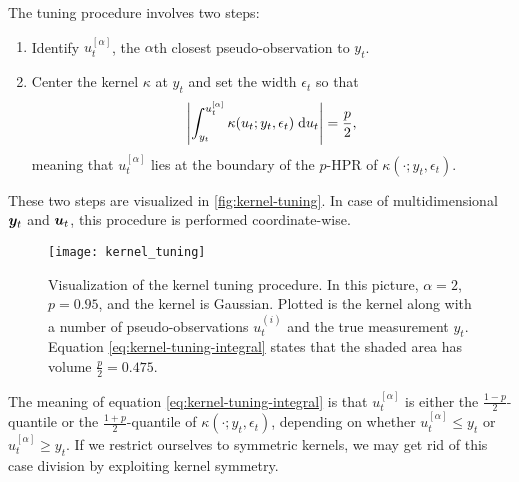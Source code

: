 The tuning procedure involves two steps:
\begin{enumerate}
    \item Identify $u_t^{[\alpha]}$, the $\alpha$th closest pseudo-observation to $y_t$.
    \item Center the kernel $\kappa$ at $y_t$ and set the width $\epsilon_t$ so that
    \begin{equation} \label{eq:kernel-tuning-integral}
    \left| \int_{y_t}^{u_t^{[\alpha]}} \kappa(u_t; y_t, \epsilon_t) \; \mathrm{d}{u_t} \right| = \frac{p}{2},
    \end{equation}
    meaning that $u_t^{[\alpha]}$ lies at the boundary of the $p$-HPR of $\kappa(\cdot; y_t, \epsilon_t)$.
\end{enumerate}
These two steps are visualized in \autoref{fig:kernel-tuning}. In case of multidimensional $\bm{y}_t$ and $\bm{u}_t$, this procedure is performed coordinate-wise. 

\begin{figure}[ht]
    \centering
    \texttt{[image: kernel\_tuning]}
    \caption{Visualization of the kernel tuning procedure. In this picture, ${\alpha = 2}$, ${p = 0.95}$, and the kernel is Gaussian. Plotted is the kernel along with a number of pseudo-observations $u_t^{(i)}$ and the true measurement $y_t$. Equation \eqref{eq:kernel-tuning-integral} states that the shaded area has volume $\frac{p}{2} = 0.475$.}
    \label{fig:kernel-tuning}
\end{figure}

The meaning of equation \eqref{eq:kernel-tuning-integral} is that $u_t^{[\alpha]}$ is either the $\frac{1-p}{2}$-quantile or the $\frac{1+p}{2}$-quantile of $\kappa(\cdot; y_t, \epsilon_t)$, depending on whether $u_t^{[\alpha]} \leq y_t$ or $u_t^{[\alpha]} \geq y_t$. If we restrict ourselves to symmetric kernels, we may get rid of this case division by exploiting kernel symmetry.

